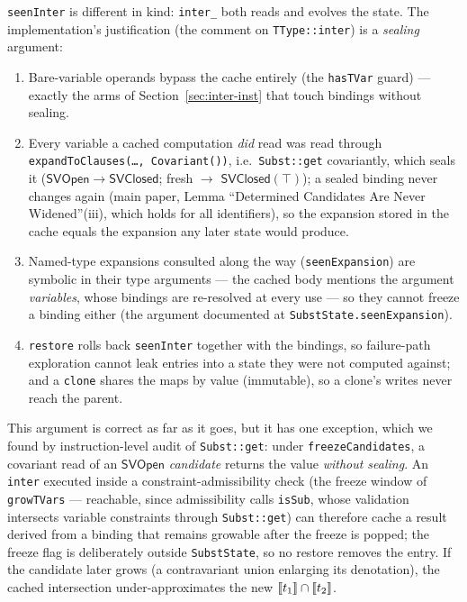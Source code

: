 \documentclass[11pt]{article}
\begin{document}
\texttt{seenInter} is different in kind: \texttt{inter\_} both reads and
evolves the state. The implementation's justification (the comment on
\texttt{TType::inter}) is a \emph{sealing} argument:
\begin{enumerate}
\item Bare-variable operands bypass the cache entirely (the
  \texttt{hasTVar} guard) — exactly the arms of
  Section~\ref{sec:inter-inst} that touch bindings without sealing.
\item Every variable a cached computation \emph{did} read was read
  through \texttt{expandToClauses(\ldots, Covariant())}, i.e.\
  \texttt{Subst::get} covariantly, which seals it
  ($\mathsf{SVOpen} \to \mathsf{SVClosed}$; fresh $\to$
  $\mathsf{SVClosed}(\top)$); a sealed binding never changes again (main
  paper, Lemma ``Determined Candidates Are Never Widened''(iii), which
  holds for all identifiers), so the expansion stored in the cache equals
  the expansion any later state would produce.
\item Named-type expansions consulted along the way
  (\texttt{seenExpansion}) are symbolic in their type arguments — the
  cached body mentions the argument \emph{variables}, whose bindings are
  re-resolved at every use — so they cannot freeze a binding either
  (the argument documented at \texttt{SubstState.seenExpansion}).
\item \texttt{restore} rolls back \texttt{seenInter} together with the
  bindings, so failure-path exploration cannot leak entries into a state
  they were not computed against; and a \texttt{clone} shares the maps
  by value (immutable), so a clone's writes never reach the parent.
\end{enumerate}
This argument is correct as far as it goes, but it has one exception,
which we found by instruction-level audit of \texttt{Subst::get}: under
\texttt{freezeCandidates}, a covariant read of an $\mathsf{SVOpen}$
\emph{candidate} returns the value \emph{without sealing}. An
\texttt{inter} executed inside a constraint-admissibility check (the
freeze window of \texttt{growTVars} — reachable, since admissibility
calls \texttt{isSub}, whose validation intersects variable constraints
through \texttt{Subst::get}) can therefore cache a result derived from a
binding that remains growable after the freeze is popped; the freeze
flag is deliberately outside \texttt{SubstState}, so no restore removes
the entry. If the candidate later grows (a contravariant union enlarging
its denotation), the cached intersection under-approximates the new
$\llbracket t_1 \rrbracket \cap \llbracket t_2 \rrbracket$.
\end{document}
